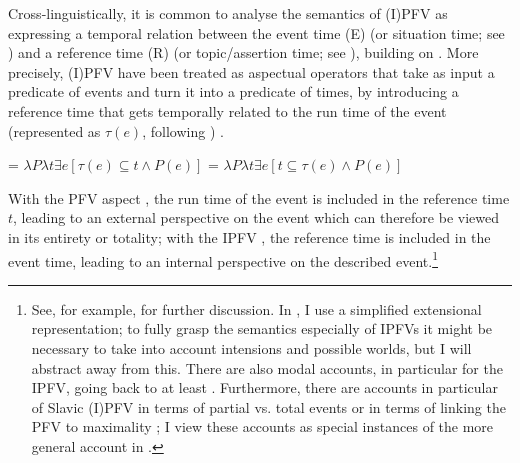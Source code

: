 \documentclass[output=paper,colorlinks,citecolor=brown]{langscibook}
\begin{document}
Cross-linguistically, it is common to analyse the semantics of (I)PFV as expressing a temporal relation between the event time (E) (or situation time; see \citealt{Klein1994,Klein1995}) and a reference time (R) (or topic/assertion time; see \citealt{Klein1994,Klein1995}), building on \citet{Reichenbach47}. More precisely, (I)PFV have been treated as aspectual operators that take as input a predicate of events and turn it into a predicate of times, by introducing a reference time that gets temporally related to the run time of the event (represented as $\tau(e)$, following \citealt{Krifka1998}) .

\ea\label{ex:graspsem}
\ea\label{ex:graspsema} 
 = $\lambda P \lambda t \exists e[\tau(e) \subseteq t \wedge P(e)]$
\ex\label{ex:graspsemb} 
 = $\lambda P \lambda t \exists e[t \subseteq \tau(e) \wedge P(e)]$
\z
\z

\largerpage
\noindent With the PFV aspect , the run time of the event is included in the reference time $t$, leading to an external perspective on the event which can therefore be viewed in its entirety or totality; with the IPFV , the reference time is included in the event time, leading to an internal perspective on the described event.\footnote{See, for example, \citet{kratzer98,ferreira2016} for further discussion. In , I use a simplified extensional representation; to fully grasp the semantics especially of IPFVs it might be necessary to take into account intensions and possible worlds, but I will abstract away from this. There are also modal accounts, in particular for the IPFV, going back to at least \citet{Dowty1979}. Furthermore, there are accounts in particular of Slavic (I)PFV in terms of partial vs. total events \citep[e.g.][]{Filip1999,altshuler14} or in terms of linking the PFV to maximality \citep[e.g.][]{Filip2008}; I view these accounts as special instances of the more general account in .}
\end{document}
